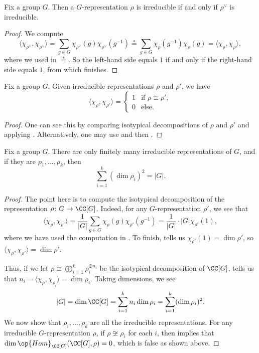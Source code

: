 \documentclass[../main.tex]{subfiles}
\begin{document}
\begin{corollary} \label{cor:irred-iff-dual-irrep}
	Fix a group $G$. Then a $G$-representation $\rho$ is irreducible if and only if $\rho^\lor$ is irreducible.
\end{corollary}
\begin{proof}
	We compute
	\[\langle\chi_{\rho^\lor},\chi_{\rho^\lor}\rangle=\sum_{g\in G}\chi_{\rho^\lor}(g)\chi_{\rho^\lor}\left(g^{-1}\right)\stackrel*=\sum_{g\in G}\chi_\rho\left(g^{-1}\right)\chi_\rho(g)=\langle\chi_\rho,\chi_\rho\rangle,\]
	where we used  in $\stackrel*=$. So the left-hand side equals $1$ if and only if the right-hand side equals $1$, from which  finishes.
\end{proof}
\begin{corollary} \label{cor:first-ortho}
	Fix a group $G$. Given irreducible representations $\rho$ and $\rho'$, we have
	\[\langle\chi_\rho,\chi_{\rho'}\rangle=\begin{cases}
		1 & \text{if }\rho\cong\rho', \\
		0 & \text{else}.
	\end{cases}\]
\end{corollary}
\begin{proof}
	One can see this by comparing isotypical decompositions of $\rho$ and $\rho'$ and applying . Alternatively, one may use  and then .
\end{proof}
\begin{corollary} \label{cor:square-sum-irreps}
	Fix a group $G$. There are only finitely many irreducible representations of $G$, and if they are $\rho_1,\ldots,\rho_k$, then
	\[\sum_{i=1}^k(\dim\rho_i)^2=|G|.\]
\end{corollary}
\begin{proof}
	The point here is to compute the isotypical decomposition of the representation $\rho\colon G\to\CC[G]$. Indeed, for any $G$-representation $\rho'$, we see that
	\[\langle\chi_\rho,\chi_{\rho'}\rangle=\frac1{|G|}\sum_{g\in G}\chi_\rho(g)\chi_{\rho'}\left(g^{-1}\right)=\frac1{|G|}\cdot|G|\chi_{\rho'}(1),\]
	where we have used the computation in . To finish,  tells us $\chi_{\rho'}(1)=\dim\rho'$, so $\langle\chi_\rho,\chi_{\rho'}\rangle=\dim\rho'$.

	Thus, if we let $\rho\cong\bigoplus_{i=1}^k\rho_i^{\oplus n_i}$ be the isotypical decomposition of $\CC[G]$,  tells us that $n_i=\langle\chi_\rho,\chi_{\rho_i}\rangle=\dim\rho_i$. Taking dimensions, we see
	\[|G|=\dim\CC[G]=\sum_{i=1}^kn_i\dim\rho_i=\sum_{i=1}^k(\dim\rho_i)^2.\]
	We now show that $\rho_i,\ldots,\rho_k$ are all the irreducible representations. For any irreducible $G$-representation $\rho$, if $\rho\not\cong\rho_i$ for each $i$, then  implies that $\dim\op{Hom}_{\CC[G]}(\CC[G],\rho)=0$, which is false as shown above.
\end{proof}
\end{document}
